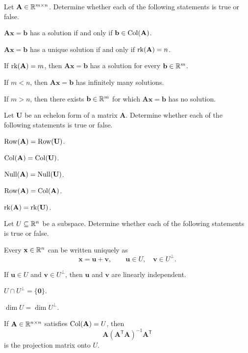 \documentclass[11pt,oneside]{article}
\begin{document}
\begin{problem}
Let $\mathbf A\in\mathbb{R}^{m\times n}$. Determine whether each of the following statements is true or false.
\begin{problemchoices}
\item $\mathbf A\mathbf x=\mathbf b$ has a solution if and only if $\mathbf b\in\operatorname{Col}(\mathbf A)$.
\item $\mathbf A\mathbf x=\mathbf b$ has a unique solution if and only if $\operatorname{rk}(\mathbf A)=n$.
\item If $\operatorname{rk}(\mathbf A)=m$, then $\mathbf A\mathbf x=\mathbf b$ has a solution for every $\mathbf b\in\mathbb{R}^m$.
\item If $m<n$, then $\mathbf A\mathbf x=\mathbf b$ has infinitely many solutions.
\item If $m>n$, then there exists $\mathbf b\in\mathbb{R}^m$ for which $\mathbf A\mathbf x=\mathbf b$ has no solution.
\end{problemchoices}
\end{problem}

\begin{problem}
Let $\mathbf U$ be an echelon form of a matrix $\mathbf A$. Determine whether each of the following statements is true or false.
\begin{problemchoices}
\item $\operatorname{Row}(\mathbf A)=\operatorname{Row}(\mathbf U)$.
\item $\operatorname{Col}(\mathbf A)=\operatorname{Col}(\mathbf U)$.
\item $\operatorname{Null}(\mathbf A)=\operatorname{Null}(\mathbf U)$.
\item $\operatorname{Row}(\mathbf A)=\operatorname{Col}(\mathbf A)$.
\item $\operatorname{rk}(\mathbf A)=\operatorname{rk}(\mathbf U)$.
\end{problemchoices}
\end{problem}

\begin{problem}
Let $U\subseteq\mathbb{R}^n$ be a subspace. Determine whether each of the following statements is true or false.
\begin{problemchoices}
\item Every $\mathbf x\in\mathbb{R}^n$ can be written uniquely as
\[
\mathbf x=\mathbf u+\mathbf v,
\qquad
\mathbf u\in U,
\quad
\mathbf v\in U^\perp.
\]
\item If $\mathbf u\in U$ and $\mathbf v\in U^\perp$, then $\mathbf u$ and $\mathbf v$ are linearly independent.
\item $U\cap U^\perp=\{\mathbf 0\}$.
\item $\dim U=\dim U^\perp$.
\item If $\mathbf A\in\mathbb{R}^{n\times n}$ satisfies $\operatorname{Col}(\mathbf A)=U$, then
\[
\mathbf A(\mathbf A^{\mathsf T}\mathbf A)^{-1}\mathbf A^{\mathsf T}
\]
is the projection matrix onto $U$.
\end{problemchoices}
\end{problem}
\end{document}
